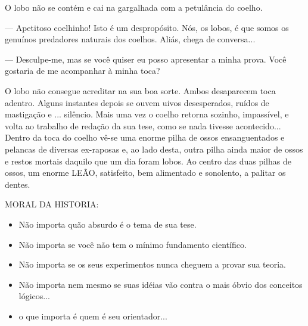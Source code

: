 O lobo não se contém e cai na gargalhada com a petulância do coelho.

--- Apetitoso coelhinho! Isto é um despropósito. Nós, os lobos, é que somos os genuínos predadores naturais dos coelhos. Aliás, chega de conversa...

--- Desculpe-me, mas se você quiser eu posso apresentar a minha prova. Você gostaria de me acompanhar à minha toca?

O lobo não consegue acreditar na sua boa sorte. Ambos desaparecem toca adentro. Alguns instantes depois se ouvem uivos desesperados, ruídos de mastigação e ... silêncio. Mais uma vez o coelho retorna sozinho, impassível, e volta ao trabalho de redação da sua tese, como se nada tivesse acontecido... Dentro da toca do coelho vê-se uma enorme pilha de ossos ensanguentados e pelancas de diversas ex-raposas e, ao lado desta, outra pilha ainda maior de ossos e restos mortais daquilo que um dia foram lobos. Ao centro das duas pilhas de ossos, um enorme LEÃO, satisfeito, bem alimentado e sonolento, a palitar os dentes.

MORAL DA HISTORIA:

\begin{itemize}
\item Não importa quão absurdo é o tema de sua tese.
\item Não importa se você não tem o mínimo fundamento científico.
\item Não importa se os seus experimentos nunca cheguem a provar sua teoria.
\item Não importa nem mesmo se suas idéias vão contra o mais óbvio dos conceitos lógicos...
\item o que importa é quem é seu orientador...
\end{itemize}

